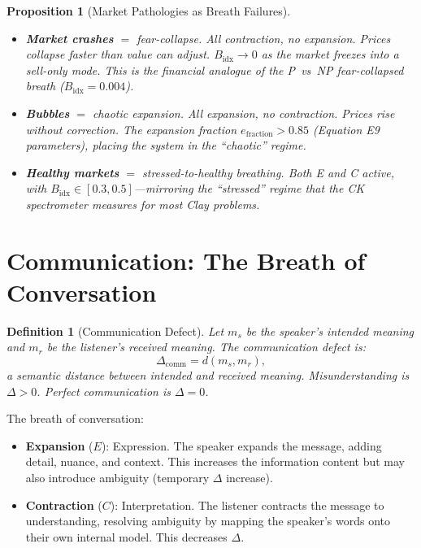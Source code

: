 \documentclass[12pt, openany]{book}
\newtheorem{proposition}[theorem]{Proposition}
\newtheorem{definition}[theorem]{Definition}
\theoremstyle{remark}
\begin{document}
\begin{proposition}[Market Pathologies as Breath Failures]
\label{prop:market-pathology}
\begin{itemize}
  \item \textbf{Market crashes} $=$ fear-collapse.  All contraction, no expansion.
        Prices collapse faster than value can adjust.  $B_{\mathrm{idx}} \to 0$
        as the market freezes into a sell-only mode.  This is the financial analogue
        of the P~vs~NP fear-collapsed breath ($B_{\mathrm{idx}} = 0.004$).
  \item \textbf{Bubbles} $=$ chaotic expansion.  All expansion, no contraction.
        Prices rise without correction.  The expansion fraction
        $e_{\mathrm{fraction}} > 0.85$ (Equation E9 parameters), placing the
        system in the ``chaotic'' regime.
  \item \textbf{Healthy markets} $=$ stressed-to-healthy breathing.  Both E and C
        active, with $B_{\mathrm{idx}} \in [0.3, 0.5]$---mirroring the ``stressed''
        regime that the CK spectrometer measures for most Clay problems.
\end{itemize}
\end{proposition}


\section{Communication: The Breath of Conversation}
\label{sec:communication}

\begin{definition}[Communication Defect]
\label{def:comm-defect}
Let $m_s$ be the speaker's intended meaning and $m_r$ be the listener's received
meaning.  The communication defect is:
\[
  \Delta_{\mathrm{comm}} = d(m_s, m_r),
\]
a semantic distance between intended and received meaning.  Misunderstanding is
$\Delta > 0$.  Perfect communication is $\Delta = 0$.
\end{definition}

\noindent
The breath of conversation:
\begin{itemize}
  \item \textbf{Expansion} ($E$): Expression.  The speaker expands the message,
        adding detail, nuance, and context.  This increases the information
        content but may also introduce ambiguity (temporary $\Delta$ increase).
  \item \textbf{Contraction} ($C$): Interpretation.  The listener contracts the
        message to understanding, resolving ambiguity by mapping the speaker's
        words onto their own internal model.  This decreases $\Delta$.
\end{itemize}
\end{document}
